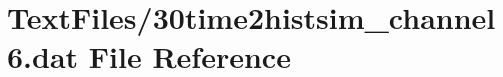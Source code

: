 \hypertarget{30time2histsim__channel6_8dat}{}\section{Text\+Files/30time2histsim\+\_\+channel6.dat File Reference}
\label{30time2histsim__channel6_8dat}
